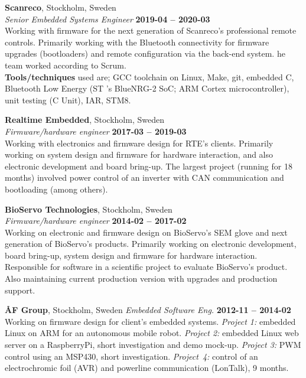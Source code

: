 \documentclass[a4paper,margin,line]{res} \usepackage{latexsym}
\begin{document}
\begin{resume}
{\bf Scanreco}, Stockholm, Sweden\\
{\em Senior Embedded Systems Engineer} \hfill {\bf 2019-04 --
  2020-03}\\ Working with firmware for the next generation of
Scanreco's professional remote controls. Primarily working with the
Bluetooth connectivity for firmware upgrades (bootloaders) and remote
configuration via the back-end system. he team worked according to
Scrum. \\ {\bf Tools/techniques} used are; GCC toolchain on Linux, Make, git,
embedded C, Bluetooth Low Energy (ST 's BlueNRG-2 SoC; ARM Cortex
microcontroller), unit testing (C Unit), IAR, STM8.

{\bf Realtime Embedded}, Stockholm, Sweden\\
{\em Firmware/hardware engineer} \hfill {\bf 2017-03 --
  2019-03}\\ Working with electronics and firmware design for RTE's
clients. Primarily working on system design and firmware for hardware
interaction, and also electronic development and board bring-up. The
largest project (running for 18 months) involved power control of an
inverter with CAN communication and bootloading (among others).

{\bf BioServo Technologies}, Stockholm, Sweden\\
{\em Firmware/hardware engineer} \hfill {\bf 2014-02 --
  2017-02}\\ Working on electronic and firmware design on BioServo's
SEM glove and next generation of BioServo's products.  Primarily
working on electronic development, board bring-up, system design and
firmware for hardware interaction. Responsible for software in a
scientific project to evaluate BioServo's product.  Also maintaining
current production version with upgrades and production support.


{\bf {\AA}F Group}, Stockholm, Sweden
{\em Embedded Software Eng.} \hfill {\bf 2012-11 -- 2014-02}\\ Working
on firmware design for client's embedded systems.  {\em Project 1:}
embedded Linux on ARM for an autonomous mobile robot.  {\em Project
  2:} embedded Linux web server on a RaspberryPi, short investigation
and demo mock-up.  {\em Project 3:} PWM control using an MSP430, short
investigation.  {\em Project~4:} control of an electrochromic foil
(AVR) and powerline communication (LonTalk), 9 months.


\end{resume}
\end{document}
